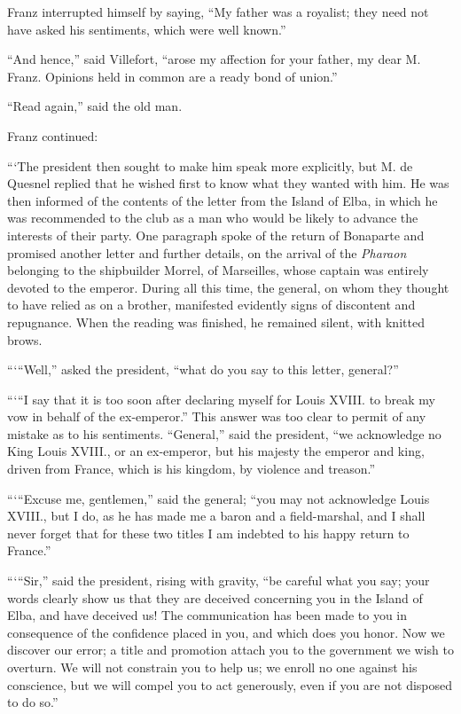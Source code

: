 Franz interrupted himself by saying, “My father was a royalist; they
need not have asked his sentiments, which were well known.”

“And hence,” said Villefort, “arose my affection for your father, my
dear M. Franz. Opinions held in common are a ready bond of union.”

“Read again,” said the old man.

Franz continued:

“‘The president then sought to make him speak more explicitly, but M.
de Quesnel replied that he wished first to know what they wanted with
him. He was then informed of the contents of the letter from the Island
of Elba, in which he was recommended to the club as a man who would be
likely to advance the interests of their party. One paragraph spoke of
the return of Bonaparte and promised another letter and further
details, on the arrival of the \textit{Pharaon} belonging to the shipbuilder
Morrel, of Marseilles, whose captain was entirely devoted to the
emperor. During all this time, the general, on whom they thought to
have relied as on a brother, manifested evidently signs of discontent
and repugnance. When the reading was finished, he remained silent, with
knitted brows.

“‘“Well,” asked the president, “what do you say to this letter,
general?”

“‘“I say that it is too soon after declaring myself for Louis XVIII. to
break my vow in behalf of the ex-emperor.” This answer was too clear to
permit of any mistake as to his sentiments. “General,” said the
president, “we acknowledge no King Louis XVIII., or an ex-emperor, but
his majesty the emperor and king, driven from France, which is his
kingdom, by violence and treason.”

“‘“Excuse me, gentlemen,” said the general; “you may not acknowledge
Louis XVIII., but I do, as he has made me a baron and a field-marshal,
and I shall never forget that for these two titles I am indebted to his
happy return to France.”

“‘“Sir,” said the president, rising with gravity, “be careful what you
say; your words clearly show us that they are deceived concerning you
in the Island of Elba, and have deceived us! The communication has been
made to you in consequence of the confidence placed in you, and which
does you honor. Now we discover our error; a title and promotion attach
you to the government we wish to overturn. We will not constrain you to
help us; we enroll no one against his conscience, but we will compel
you to act generously, even if you are not disposed to do so.”

